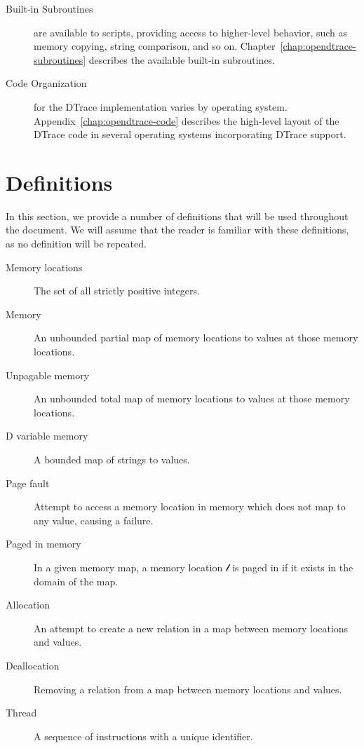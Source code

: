 \begin{description}
\item[Built-in Subroutines] are available to scripts, providing access to
  higher-level behavior, such as memory copying, string comparison, and so on.
  Chapter~\ref{chap:opendtrace-subroutines} describes the available built-in
  subroutines.

\item[Code Organization] for the DTrace implementation varies by operating
  system.
  Appendix~\ref{chap:opendtrace-code} describes the high-level layout of the
  DTrace code in several operating systems incorporating DTrace support.


\end{description}

\section{Definitions}

In this section, we provide a number of definitions that will be used throughout
the document. We will assume that the reader is familiar with these definitions,
as no definition will be repeated.

\begin{description}
\item[Memory locations] The set of all strictly positive integers.
\item[Memory] An unbounded partial map of memory locations to values at those memory
  locations.
\item[Unpagable memory] An unbounded total map of memory locations to values at those memory
  locations.
\item[D variable memory] A bounded map of strings to values.
\item[Page fault] Attempt to access a memory location in memory which does not map to
  any value, causing a failure.
\item[Paged in memory] In a given memory map, a memory location $\mathcal{l}$ is
  paged in if it exists in the domain of the map.
\item[Allocation] An attempt to create a new relation in a map between memory locations and
  values.
\item[Deallocation] Removing a relation from a map between memory locations and values.
\item[Thread] A sequence of instructions with a unique identifier.
\end{description}
